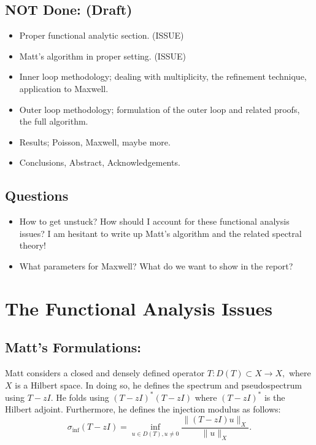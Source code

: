 \documentclass[12pt,a4paper]{article}
\begin{document}
\subsection{NOT Done: (Draft)}
\begin{itemize}
    \item Proper functional analytic section. (ISSUE)
    \item Matt's algorithm in proper setting. (ISSUE)
    \item Inner loop methodology; dealing with multiplicity, the refinement technique, application to Maxwell.
    \item Outer loop methodology; formulation of the outer loop and related proofs, the full algorithm.
    \item Results; Poisson, Maxwell, maybe more. 
    \item Conclusions, Abstract, Acknowledgements. 
\end{itemize}

\subsection{Questions}
\begin{itemize}
    \item How to get unstuck? How should I account for these functional analysis issues? I am hesitant to write up Matt's algorithm and the related spectral theory!
    \item What parameters for Maxwell? What do we want to show in the report? 
\end{itemize}


\section{The Functional Analysis Issues}


\subsection{Matt's Formulations:}

Matt considers a closed and densely defined operator $T : D(T) \subset X \rightarrow X,$ where $X$ is a Hilbert space. In doing so, he defines the spectrum and pseudospectrum using $T-zI.$ He folds using $(T-zI)^*(T-zI)$ where $(T-zI)^*$ is the Hilbert adjoint. Furthermore, he defines the injection modulus as follows:
\begin{equation}
    \sigma_{\inf}(T-zI) = \inf_{u \in D(T), u \ne 0} \frac{ \| (T-zI)u \|_X} {\|u\|_X}.
\end{equation}
\end{document}
